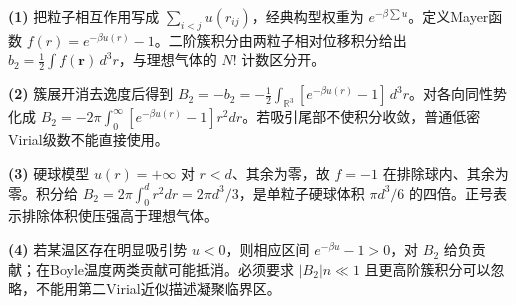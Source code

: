 \par\noindent\textbf{(1)} 把粒子相互作用写成 \(\sum_{i<j}u(r_{ij})\)，经典构型权重为 \(e^{-\beta\sum u}\)。定义Mayer函数 \(f(r)=e^{-\beta u(r)}-1\)。二阶簇积分由两粒子相对位移积分给出 \(b_2=\frac12\int f(\boldsymbol r)\,d^3r\)，与理想气体的 \(N!\) 计数区分开。
\par\noindent\textbf{(2)} 簇展开消去逸度后得到 \(B_2=-b_2=-\frac12\int_{\mathbb R^3}[e^{-\beta u(r)}-1]\,d^3r\)。对各向同性势化成 \(B_2=-2\pi\int_0^\infty[e^{-\beta u(r)}-1]r^2dr\)。若吸引尾部不使积分收敛，普通低密Virial级数不能直接使用。
\par\noindent\textbf{(3)} 硬球模型 \(u(r)=+\infty\) 对 \(r<d\)、其余为零，故 \(f=-1\) 在排除球内、其余为零。积分给 \(B_2=2\pi\int_0^d r^2dr=2\pi d^3/3\)，是单粒子硬球体积 \(\pi d^3/6\) 的四倍。正号表示排除体积使压强高于理想气体。
\par\noindent\textbf{(4)} 若某温区存在明显吸引势 \(u<0\)，则相应区间 \(e^{-\beta u}-1>0\)，对 \(B_2\) 给负贡献；在Boyle温度两类贡献可能抵消。必须要求 \(|B_2|n\ll1\) 且更高阶簇积分可以忽略，不能用第二Virial近似描述凝聚临界区。
